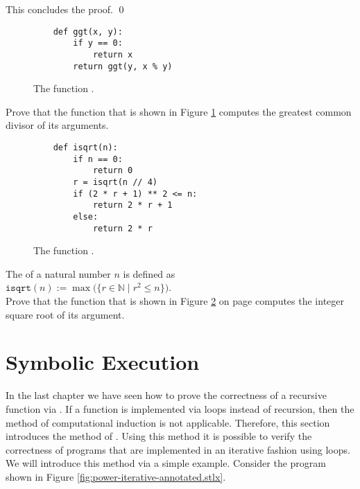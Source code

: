 This concludes the proof. \qed

\begin{figure}[!h]
  \centering
\begin{verbatim}
    def ggt(x, y):
        if y == 0:
            return x
        return ggt(y, x % y)
\end{verbatim}
\vspace*{-0.3cm}
  \caption{The function .}
  \label{fig:gcd}
\end{figure}

\exerciseEng
Prove that the function  that is shown in Figure \ref{fig:gcd} computes the greatest common divisor
of its arguments. \eox

\begin{figure}[!h]
  \centering
\begin{verbatim}
    def isqrt(n):
        if n == 0:
            return 0
        r = isqrt(n // 4)
        if (2 * r + 1) ** 2 <= n:
            return 2 * r + 1
        else:
            return 2 * r
\end{verbatim}
\vspace*{-0.3cm}
  \caption{The function .}
  \label{fig:isqrt}
\end{figure} 




\exerciseEng
The  of a natural number $n$ is defined as 
\\[0.2cm]
\hspace*{1.3cm}
$\texttt{isqrt}(n) := \max\bigl(\{ r \in \mathbb{N} \mid r^2 \leq n \}\bigr)$.
\\[0.2cm]
Prove that the function  that is shown in Figure \ref{fig:isqrt} on page \pageref{fig:isqrt}
computes the integer square root of its argument. \eox





\section{Symbolic Execution}
In the last chapter we have seen how to prove the correctness of a recursive function via
.  If a function is implemented via loops instead of recursion, then the method
of computational induction is not applicable.  Therefore, this section introduces the method of
.   Using this method it is possible to verify the
correctness of programs that are implemented in an iterative fashion using loops. 
We will introduce this method via a simple example.  Consider the program shown in Figure
\ref{fig:power-iterative-annotated.stlx}. 

